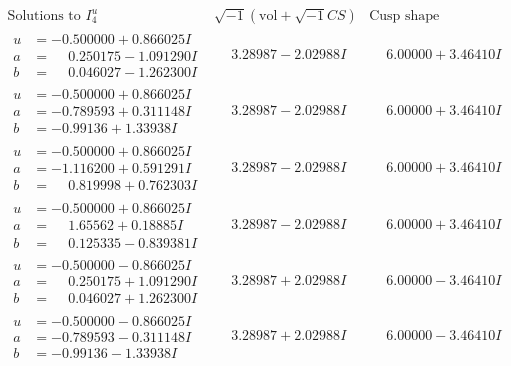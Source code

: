 \documentclass[1p]{elsarticle_modified}
\theoremstyle{definition}
\newcommand{\I}{\sqrt{-1}}
\begin{document}
$$\begin{array}{c|c|c}  
\text{Solutions to }I^u_{4}& \I (\text{vol} + \sqrt{-1}CS) & \text{Cusp shape}\\
 \hline 
\begin{aligned}
u &= -0.500000 + 0.866025 I \\
a &= \phantom{-}0.250175 - 1.091290 I \\
b &= \phantom{-}0.046027 - 1.262300 I\end{aligned}
 & \phantom{-}3.28987 - 2.02988 I & \phantom{-}6.00000 + 3.46410 I \\ \hline\begin{aligned}
u &= -0.500000 + 0.866025 I \\
a &= -0.789593 + 0.311148 I \\
b &= -0.99136 + 1.33938 I\end{aligned}
 & \phantom{-}3.28987 - 2.02988 I & \phantom{-}6.00000 + 3.46410 I \\ \hline\begin{aligned}
u &= -0.500000 + 0.866025 I \\
a &= -1.116200 + 0.591291 I \\
b &= \phantom{-}0.819998 + 0.762303 I\end{aligned}
 & \phantom{-}3.28987 - 2.02988 I & \phantom{-}6.00000 + 3.46410 I \\ \hline\begin{aligned}
u &= -0.500000 + 0.866025 I \\
a &= \phantom{-}1.65562 + 0.18885 I \\
b &= \phantom{-}0.125335 - 0.839381 I\end{aligned}
 & \phantom{-}3.28987 - 2.02988 I & \phantom{-}6.00000 + 3.46410 I \\ \hline\begin{aligned}
u &= -0.500000 - 0.866025 I \\
a &= \phantom{-}0.250175 + 1.091290 I \\
b &= \phantom{-}0.046027 + 1.262300 I\end{aligned}
 & \phantom{-}3.28987 + 2.02988 I & \phantom{-}6.00000 - 3.46410 I \\ \hline\begin{aligned}
u &= -0.500000 - 0.866025 I \\
a &= -0.789593 - 0.311148 I \\
b &= -0.99136 - 1.33938 I\end{aligned}
 & \phantom{-}3.28987 + 2.02988 I & \phantom{-}6.00000 - 3.46410 I \\ \hline\begin{aligned}

\end{aligned}
\end{array}$$
\end{document}
